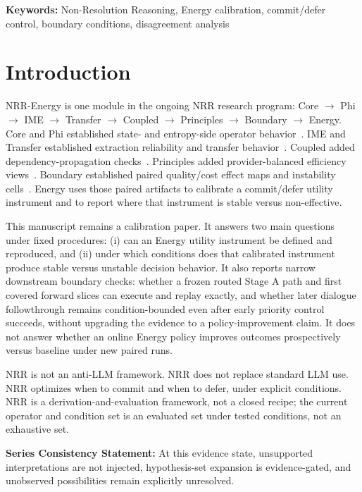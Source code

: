 \documentclass[11pt,a4paper]{article}
\begin{document}
\noindent\textbf{Keywords:} Non-Resolution Reasoning, Energy calibration, commit/defer control, boundary conditions, disagreement analysis

\section{Introduction}
\label{sec:intro}

NRR-Energy is one module in the ongoing NRR research program:
Core $\rightarrow$ Phi $\rightarrow$ IME $\rightarrow$ Transfer $\rightarrow$ Coupled $\rightarrow$ Principles $\rightarrow$ Boundary $\rightarrow$ Energy.
Core and Phi established state- and entropy-side operator behavior~\cite{saito2025nrr,saito2026phi}. IME and Transfer established extraction reliability and transfer behavior~\cite{saito2026ime,saito2026transfer}. Coupled added dependency-propagation checks~\cite{saito2026coupled}. Principles added provider-balanced efficiency views~\cite{saito2026principles}. Boundary established paired quality/cost effect maps and instability cells~\cite{saito2026boundary}. Energy uses those paired artifacts to calibrate a commit/defer utility instrument and to report where that instrument is stable versus non-effective.

This manuscript remains a calibration paper. It answers two main questions under fixed procedures: (i) can an Energy utility instrument be defined and reproduced, and (ii) under which conditions does that calibrated instrument produce stable versus unstable decision behavior. It also reports narrow downstream boundary checks: whether a frozen routed Stage A path and first covered forward slices can execute and replay exactly, and whether later dialogue followthrough remains condition-bounded even after early priority control succeeds, without upgrading the evidence to a policy-improvement claim. It does not answer whether an online Energy policy improves outcomes prospectively versus baseline under new paired runs.

NRR is not an anti-LLM framework.
NRR does not replace standard LLM use.
NRR optimizes when to commit and when to defer, under explicit conditions.
NRR is a derivation-and-evaluation framework, not a closed recipe; the current operator and condition set is an evaluated set under tested conditions, not an exhaustive set.

\textbf{Series Consistency Statement:}
At this evidence state, unsupported interpretations are not injected, hypothesis-set expansion is evidence-gated, and unobserved possibilities remain explicitly unresolved.
\end{document}

